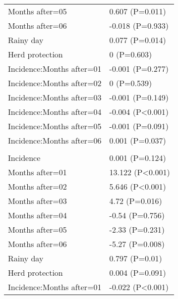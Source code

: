 \documentclass[]{article}
\begin{document}
\begin{longtable}[t]{ll}
\hspace{1em}Months after=05 & 0.607 (P=0.011)\\
\hspace{1em}Months after=06 & -0.018 (P=0.933)\\
\hspace{1em}Rainy day & 0.077 (P=0.014)\\
\hspace{1em}Herd protection & 0 (P=0.603)\\
\hspace{1em}Incidence:Months after=01 & -0.001 (P=0.277)\\
\hspace{1em}Incidence:Months after=02 & 0 (P=0.539)\\
\hspace{1em}Incidence:Months after=03 & -0.001 (P=0.149)\\
\hspace{1em}Incidence:Months after=04 & -0.004 (P<0.001)\\
\hspace{1em}Incidence:Months after=05 & -0.001 (P=0.091)\\
\hspace{1em}Incidence:Months after=06 & 0.001 (P=0.037)\\
\addlinespace[1.5em]
\multicolumn{2}{l}{\textbf{Temporary not field worker}}\\
\hspace{1em}Incidence & 0.001 (P=0.124)\\
\hspace{1em}Months after=01 & 13.122 (P<0.001)\\
\hspace{1em}Months after=02 & 5.646 (P<0.001)\\
\hspace{1em}Months after=03 & 4.72 (P=0.016)\\
\hspace{1em}Months after=04 & -0.54 (P=0.756)\\
\hspace{1em}Months after=05 & -2.33 (P=0.231)\\
\hspace{1em}Months after=06 & -5.27 (P=0.008)\\
\hspace{1em}Rainy day & 0.797 (P=0.01)\\
\hspace{1em}Herd protection & 0.004 (P=0.091)\\
\hspace{1em}Incidence:Months after=01 & -0.022 (P<0.001)\\

\end{longtable}
\end{document}
